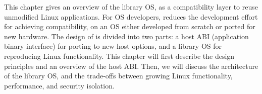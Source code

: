 This chapter gives an overview of the \graphene{} library OS, as a compatibility layer to reuse unmodified Linux applications. For OS developers, \graphene{} reduces the development effort for achieving compatibility,
on an OS either developed from scratch or ported for new hardware.
The design of \graphene{} is divided into two parts: a host ABI (application binary interface) for porting to new host options, and a library OS for reproducing Linux functionality.
This chapter will first describe the design principles and an overview of the host ABI. 
Then, we will discuss the architecture of the library OS, and the trade-offs between growing Linux functionality, performance, and security isolation.
